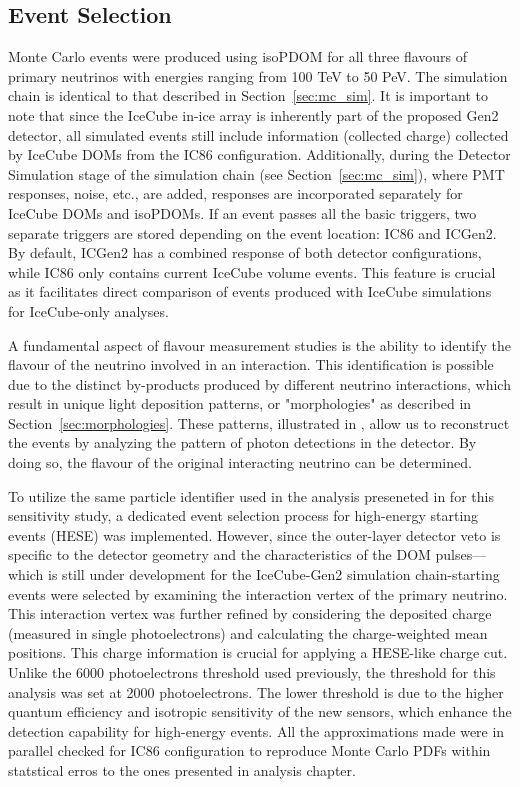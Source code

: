 \subsection{Event Selection}
\label{sec:gen2_eventsample}

Monte Carlo events were produced using isoPDOM for all three flavours of primary neutrinos with energies ranging from 100 TeV to 50 PeV. The simulation chain is identical to that described in Section~\ref{sec:mc_sim}. It is important to note that since the IceCube in-ice array is inherently part of the proposed Gen2 detector, all simulated events still include information (collected charge) collected by IceCube DOMs from the IC86 configuration. Additionally, during the Detector Simulation stage of the simulation chain (see Section~\ref{sec:mc_sim}), where PMT responses, noise, etc., are added, responses are incorporated separately for IceCube DOMs and isoPDOMs. If an event passes all the basic triggers, two separate triggers are stored depending on the event location: IC86 and ICGen2. By default, ICGen2 has a combined response of both detector configurations, while IC86 only contains current IceCube volume events. This feature is crucial as it facilitates direct comparison of events produced with IceCube simulations for IceCube-only analyses.

A fundamental aspect of flavour measurement studies is the ability to identify the flavour of the neutrino involved in an interaction. This identification is possible due to the distinct by-products produced by different neutrino interactions, which result in unique light deposition patterns, or "morphologies" as described in Section~\ref{sec:morphologies}. These patterns, illustrated in , allow us to reconstruct the events by analyzing the pattern of photon detections in the detector. By doing so, the flavour of the original interacting neutrino can be determined.

To utilize the same particle identifier used in the analysis preseneted in  for this sensitivity study, a dedicated event selection process for high-energy starting events (HESE)  was implemented. However, since the outer-layer detector veto is specific to the detector geometry and the characteristics of the DOM pulses—which is still under development for the IceCube-Gen2 simulation chain-starting events were selected by examining the interaction vertex of the primary neutrino. This interaction vertex was further refined by considering the deposited charge (measured in single photoelectrons) and calculating the charge-weighted mean positions. This charge information is crucial for applying a HESE-like charge cut. Unlike the 6000 photoelectrons threshold used previously, the threshold for this analysis was set at 2000 photoelectrons. The lower threshold is due to the higher quantum efficiency and isotropic sensitivity of the new sensors, which enhance the detection capability for high-energy events. All the approximations made were in parallel checked for IC86 configuration to reproduce Monte Carlo PDFs within statstical erros to the ones presented in analysis chapter.

